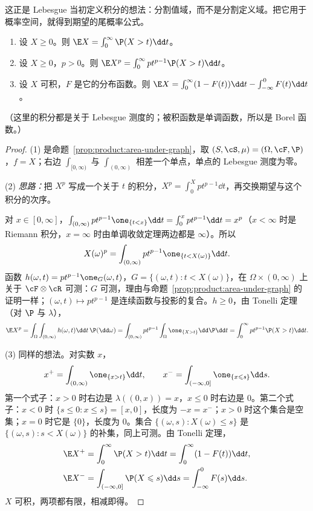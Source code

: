 这正是 Lebesgue 当初定义积分的想法：分割值域，而不是分割定义域。把它用于概率空间，就得到期望的尾概率公式。

\begin{theorem}[期望的尾概率公式]\label{thm:product:tail-formula}
\begin{enumerate}
\item 设 $X\geqslant0$。则 $\E X=\int_0^\infty \P(X>t)\dd t$。
\item 设 $X\geqslant0$，$p>0$。则 $\E X^p=\int_0^\infty pt^{p-1}\P(X>t)\dd t$。
\item 设 $X$ 可积，$F$ 是它的分布函数。则 $\E X=\int_0^\infty(1-F(t))\dd t-\int_{-\infty}^0F(t)\dd t$。
\end{enumerate}
（这里的积分都是关于 Lebesgue 测度的；被积函数是单调函数，所以是 Borel 函数。）
\end{theorem}
\begin{proof}
(1) 是命题~\ref{prop:product:area-under-graph}，取 $(S,\cS,\mu)=(\Omega,\cF,\P)$，$f=X$；右边 $\int_{[0,\infty)}$ 与 $\int_{(0,\infty)}$ 相差一个单点，单点的 Lebesgue 测度为零。

(2) \emph{思路：}把 $X^p$ 写成一个关于 $t$ 的积分，$X^p=\int_0^Xpt^{p-1}\dd t$，再交换期望与这个积分的次序。

对 $x\in[0,\infty]$，$\int_{(0,\infty)}pt^{p-1}\one_{\{t<x\}}\dd t=\int_0^xpt^{p-1}\dd t=x^p$（$x<\infty$ 时是 Riemann 积分，$x=\infty$ 时由单调收敛定理两边都是 $\infty$）。所以
\[
X(\omega)^p=\int_{(0,\infty)}pt^{p-1}\one_{\{t<X(\omega)\}}\dd t .
\]
函数 $h(\omega,t)=pt^{p-1}\one_G(\omega,t)$，$G=\{(\omega,t):t<X(\omega)\}$，在 $\Omega\times(0,\infty)$ 上关于 $\cF\otimes\cR$ 可测：$G$ 可测，理由与命题~\ref{prop:product:area-under-graph} 的证明一样；$(\omega,t)\mapsto pt^{p-1}$ 是连续函数与投影的复合。$h\geqslant0$，由 Tonelli 定理（对 $\P$ 与 $\lambda$），
\[
\E X^p=\int_\Omega\int_{(0,\infty)}h(\omega,t)\dd t\,\P(\dd\omega)=\int_{(0,\infty)}pt^{p-1}\int_\Omega\one_{\{X>t\}}\dd \P\dd t=\int_0^\infty pt^{p-1}\P(X>t)\dd t .
\]

(3) 同样的想法。对实数 $x$，
\[
x^+=\int_{(0,\infty)}\one_{\{x>t\}}\dd t,\qquad x^-=\int_{(-\infty,0]}\one_{\{x\leqslant s\}}\dd s .
\]
第一个式子：$x>0$ 时右边是 $\lambda((0,x))=x$，$x\leqslant0$ 时右边是 $0$。第二个式子：$x<0$ 时 $\{s\leqslant0:x\leqslant s\}=[x,0]$，长度为 $-x=x^-$；$x>0$ 时这个集合是空集；$x=0$ 时它是 $\{0\}$，长度为 $0$。集合 $\{(\omega,s):X(\omega)\leqslant s\}$ 是 $\{(\omega,s):s<X(\omega)\}$ 的补集，同上可测。由 Tonelli 定理，
\[
\begin{aligned}
\E X^+&=\int_0^\infty \P(X>t)\dd t=\int_0^\infty(1-F(t))\dd t,\\
\E X^-&=\int_{(-\infty,0]}\P(X\leqslant s)\dd s=\int_{-\infty}^0F(s)\dd s .
\end{aligned}
\]
$X$ 可积，两项都有限，相减即得。
\end{proof}

